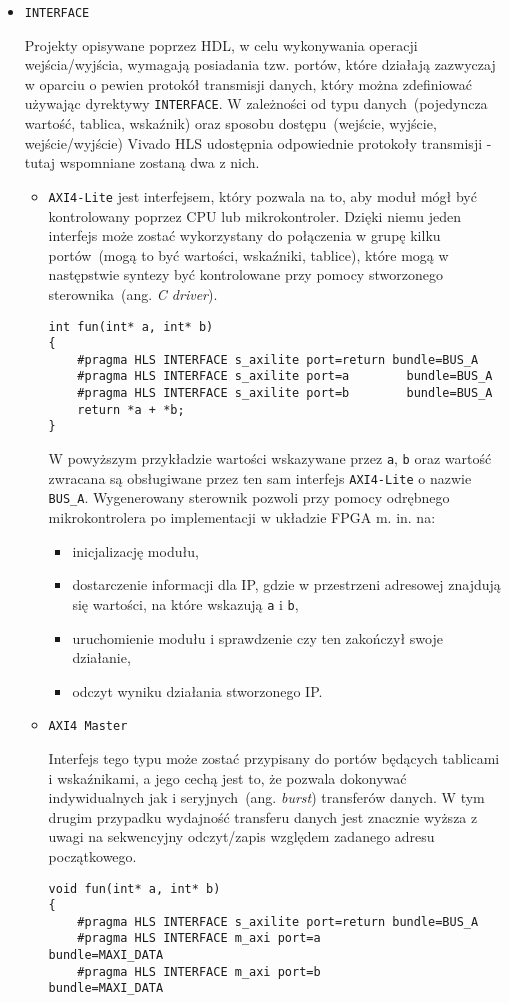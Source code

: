 \begin{itemize}
\item \texttt{INTERFACE}

Projekty opisywane poprzez HDL, w celu wykonywania operacji wejścia/wyjścia, wymagają posiadania tzw. portów, które działają zazwyczaj w oparciu o pewien protokół transmisji danych, który można zdefiniować używając dyrektywy \texttt{INTERFACE}. W zależności od typu danych~(pojedyncza wartość, tablica, wskaźnik) oraz sposobu dostępu~(wejście, wyjście, wejście/wyjście) Vivado HLS udostępnia odpowiednie protokoły transmisji - tutaj wspomniane zostaną dwa z nich.
\begin{itemize}
\item \texttt{AXI4-Lite} jest interfejsem, który pozwala na to, aby moduł mógł być kontrolowany poprzez CPU lub mikrokontroler. Dzięki niemu jeden interfejs może zostać wykorzystany do połączenia w grupę kilku portów~(mogą to być wartości, wskaźniki, tablice), które mogą w następstwie syntezy być kontrolowane przy pomocy stworzonego sterownika~(ang. \textit{C driver}). 
\begin{lstlisting}[caption=Przykład użycia interfejsu \texttt{AXI4-Lite}]
int fun(int* a, int* b)
{
	#pragma HLS INTERFACE s_axilite port=return bundle=BUS_A
	#pragma HLS INTERFACE s_axilite port=a 		  bundle=BUS_A
	#pragma HLS INTERFACE s_axilite port=b 		  bundle=BUS_A
	return *a + *b;
}
\end{lstlisting}
W powyższym przykładzie wartości wskazywane przez \texttt{a}, \texttt{b} oraz wartość zwracana są obsługiwane przez ten sam interfejs \texttt{AXI4-Lite} o nazwie \texttt{BUS\_A}. Wygenerowany sterownik pozwoli przy pomocy odrębnego mikrokontrolera po implementacji w układzie FPGA m. in. na:
\begin{itemize}
\item inicjalizację modułu,
\item dostarczenie informacji dla IP, gdzie w przestrzeni adresowej znajdują się wartości, na które wskazują \texttt{a} i \texttt{b},
\item uruchomienie modułu i sprawdzenie czy ten zakończył swoje działanie,
\item odczyt wyniku działania stworzonego IP.
\end{itemize}
\item \texttt{AXI4 Master}

Interfejs tego typu może zostać przypisany do portów będących tablicami i wskaźnikami, a jego cechą jest to, że pozwala dokonywać indywidualnych jak i seryjnych~(ang. \textit{burst}) transferów danych. W tym drugim przypadku wydajność transferu danych jest znacznie wyższa z uwagi na sekwencyjny odczyt/zapis względem zadanego adresu początkowego.
\begin{lstlisting}[caption=Przykład użycia interfejsu \texttt{AXI4 Master} z seryjnym dostępem do danych. Zmiana adresów wskazywanych umożliwiona została poprzez interfejs \texttt{AXI4-Lite}]
void fun(int* a, int* b)
{
	#pragma HLS INTERFACE s_axilite port=return bundle=BUS_A
	#pragma HLS INTERFACE m_axi port=a 		    bundle=MAXI_DATA
	#pragma HLS INTERFACE m_axi port=b 		    bundle=MAXI_DATA


\end{lstlisting}
\end{itemize}
\end{itemize}
